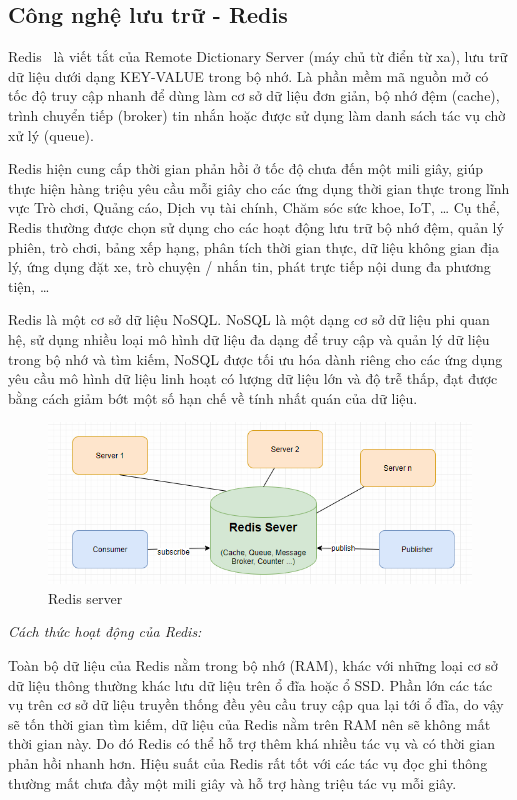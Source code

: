 \subsection{Công nghệ lưu trữ - Redis}
Redis~\cite{redis:online} là viết tắt của Remote Dictionary Server
(máy chủ từ điển từ xa), lưu trữ dữ liệu dưới dạng
KEY-VALUE trong bộ nhớ. Là phần mềm mã nguồn mở có tốc độ
truy cập nhanh để dùng làm cơ sở dữ liệu đơn giản, bộ nhớ đệm (cache),
trình chuyển tiếp (broker) tin nhắn hoặc
được sử dụng làm danh sách tác vụ chờ xử lý (queue). 

Redis hiện cung cấp thời gian phản hồi ở tốc độ chưa đến
một mili giây, giúp thực hiện hàng triệu yêu cầu mỗi giây cho
các ứng dụng thời gian thực trong lĩnh vực Trò chơi, Quảng cáo, Dịch
vụ tài chính, Chăm sóc sức khoe, IoT, … Cụ thể, Redis thường được chọn
sử dụng cho các hoạt động lưu trữ bộ nhớ đệm, quản lý phiên, trò chơi,
bảng xếp hạng, phân tích thời gian thực, dữ liệu không gian
địa lý, ứng dụng đặt xe, trò chuyện / nhắn tin, phát trực tiếp
nội dung đa phương tiện, …

Redis là một cơ sở dữ liệu NoSQL. NoSQL là một dạng cơ sở dữ liệu
phi quan hệ, sử dụng nhiều loại mô hình dữ liệu đa dạng để
truy cập và quản lý dữ liệu trong bộ nhớ và tìm kiếm, NoSQL được
tối ưu hóa dành riêng cho các ứng dụng yêu cầu mô hình dữ liệu
linh hoạt có lượng dữ liệu lớn và độ trễ thấp, đạt được bằng cách
giảm bớt một số hạn chế về tính nhất quán của dữ liệu.

\begin{figure}[H]
    \centering
    \includegraphics[width=14cm]{images/redis.png}
    \caption{Redis server}
\end{figure}

\textit{Cách thức hoạt động của Redis:}

Toàn bộ dữ liệu của Redis nằm trong bộ nhớ (RAM), khác với những loại 
cơ sở dữ liệu thông thường khác lưu dữ liệu trên ổ đĩa hoặc ổ SSD. 
Phần lớn các tác vụ trên cơ sở dữ liệu truyền thống đều yêu cầu 
truy cập qua lại tới ổ đĩa, do vậy sẽ tốn thời gian tìm kiếm, 
dữ liệu của Redis nằm trên RAM nên sẽ không mất thời gian này. 
Do đó Redis có thể hỗ trợ thêm khá nhiều tác vụ và có thời gian 
phản hồi nhanh hơn. Hiệu suất của Redis rất tốt với các tác 
vụ đọc ghi thông thường mất chưa đầy một mili giây và hỗ trợ 
hàng triệu tác vụ mỗi giây. 

